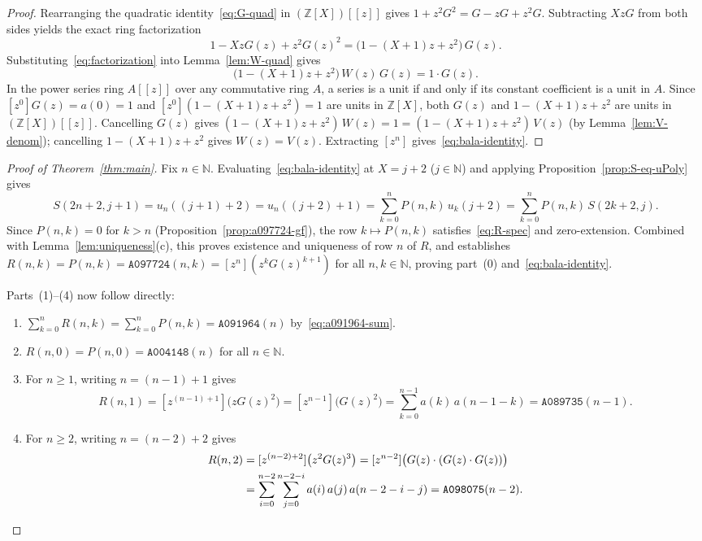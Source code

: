 \documentclass[11pt]{article}
\newcommand{\llbracket}{[\![}
\newcommand{\rrbracket}{]\!]}
\theoremstyle{definition}
\newcommand{\N}{\mathbb{N}}
\newcommand{\Z}{\mathbb{Z}}
\newcommand{\seq}[1]{\texttt{#1}}
\begin{document}
\begin{proof}
Rearranging the quadratic identity~\eqref{eq:G-quad} in $(\Z[X])\llbracket z \rrbracket$ gives $1 + z^2 G^2 = G - z G + z^2 G$. Subtracting $X z G$ from both sides yields the exact ring factorization
\begin{equation}
\label{eq:factorization}
1 - X z G(z) + z^2 G(z)^2 = \bigl(1 - (X + 1)z + z^2\bigr)\,G(z).
\end{equation}
Substituting~\eqref{eq:factorization} into Lemma~\ref{lem:W-quad} gives
\[
\bigl(1 - (X + 1)z + z^2\bigr)\,W(z)\,G(z) = 1 \cdot G(z).
\]
In the power series ring $A\llbracket z \rrbracket$ over any commutative ring $A$, a series is a unit if and only if its constant coefficient is a unit in $A$. Since $[z^0]G(z) = a(0) = 1$ and $[z^0](1 - (X+1)z + z^2) = 1$ are units in $\Z[X]$, both $G(z)$ and $1 - (X+1)z + z^2$ are units in $(\Z[X])\llbracket z \rrbracket$. Cancelling $G(z)$ gives $(1 - (X+1)z + z^2)\,W(z) = 1 = (1 - (X+1)z + z^2)\,V(z)$ (by Lemma~\ref{lem:V-denom}); cancelling $1 - (X+1)z + z^2$ gives $W(z) = V(z)$. Extracting $[z^n]$ gives~\eqref{eq:bala-identity}.
\end{proof}

\begin{proof}[Proof of Theorem~\ref{thm:main}]
Fix $n \in \N$. Evaluating~\eqref{eq:bala-identity} at $X = j + 2$ ($j \in \N$) and applying Proposition~\ref{prop:S-eq-uPoly} gives
\[
S(2n + 2, j + 1) = u_n((j + 1) + 2) = u_n((j + 2) + 1) = \sum_{k=0}^{n} P(n, k)\,u_k(j + 2) = \sum_{k=0}^{n} P(n, k)\,S(2k + 2, j).
\]
Since $P(n, k) = 0$ for $k > n$ (Proposition~\ref{prop:a097724-gf}), the row $k \mapsto P(n, k)$ satisfies~\eqref{eq:R-spec} and zero-extension. Combined with Lemma~\ref{lem:uniqueness}(c), this proves existence and uniqueness of row $n$ of $R$, and establishes $R(n, k) = P(n, k) = \seq{A097724}(n, k) = [z^n](z^k G(z)^{k+1})$ for all $n, k \in \N$, proving part~(0) and~\eqref{eq:bala-identity}.

Parts~(1)--(4) now follow directly:
\begin{enumerate}
\item[\textup{(1)}] $\sum_{k=0}^n R(n, k) = \sum_{k=0}^n P(n, k) = \seq{A091964}(n)$ by~\eqref{eq:a091964-sum}.
\item[\textup{(2)}] $R(n, 0) = P(n, 0) = \seq{A004148}(n)$ for all $n \in \N$.
\item[\textup{(3)}] For $n \ge 1$, writing $n = (n - 1) + 1$ gives
\[
R(n, 1) = [z^{(n-1)+1}]\bigl(z G(z)^2\bigr) = [z^{n-1}]\bigl(G(z)^2\bigr) = \sum_{k=0}^{n-1} a(k)\,a(n - 1 - k) = \seq{A089735}(n - 1).
\]
\item[\textup{(4)}] For $n \ge 2$, writing $n = (n - 2) + 2$ gives
\begin{align*}
R(n, 2) &= [z^{(n-2)+2}]\bigl(z^2 G(z)^3\bigr) = [z^{n-2}]\bigl(G(z)\cdot(G(z)\cdot G(z))\bigr) \\
&= \sum_{i=0}^{n-2}\sum_{j=0}^{n-2-i} a(i)\,a(j)\,a(n - 2 - i - j) = \seq{A098075}(n - 2). \qedhere
\end{align*}
\end{enumerate}
\end{proof}
\end{document}

